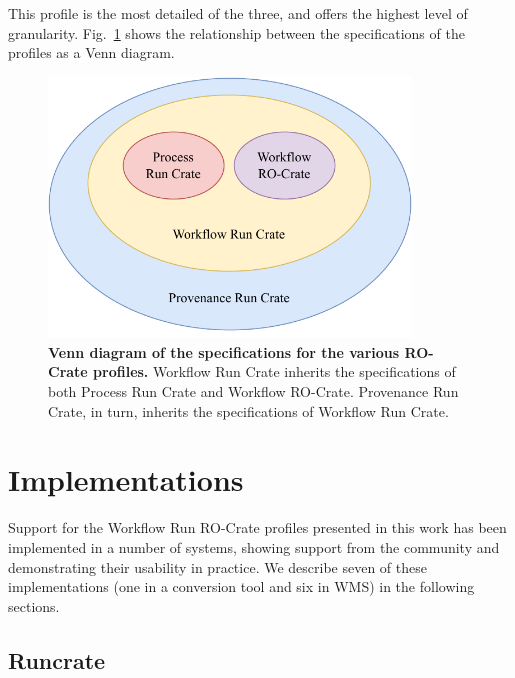 \documentclass[10pt,letterpaper]{article}
\begin{document}
This profile is the most detailed of the three, and offers the highest level of granularity. Fig.~\ref{fig:profile_venn} shows the relationship between the specifications of the profiles as a Venn diagram.

\begin{figure}[!h]
  \includegraphics[width=26em]{wrroc-venn.drawio.pdf}
  \caption{{\bf Venn diagram of the specifications for the various RO-Crate profiles.}
  Workflow Run Crate inherits the specifications of both Process Run Crate and Workflow RO-Crate. Provenance Run Crate, in turn, inherits the specifications of Workflow Run Crate.}
  \label{fig:profile_venn}
  \end{figure}


\section{Implementations}\label{implementations}

Support for the Workflow Run RO-Crate profiles presented in this work has been implemented in a number of systems, showing support from the community and demonstrating their usability in practice.
We describe seven of these implementations (one in a conversion tool and six in WMS) in the following sections.


\subsection{Runcrate}\label{runcrate}
\end{document}
